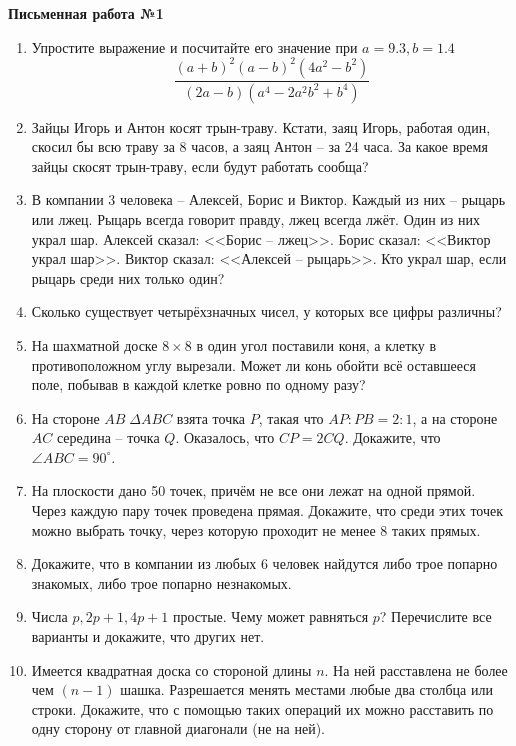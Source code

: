 \documentclass[12pt]{article}
\begin{document}
\centerline{\large \bf Письменная работа №1}
\begin{enumerate}
\item Упростите выражение и посчитайте его значение при $a = 9.3, b = 1.4$
\begin{equation*}
\frac{(a + b)^2(a - b)^2(4a^2 - b^2)}{(2a - b)(a^4 - 2a^2b^2 + b^4)}
\end{equation*}
\item Зайцы Игорь и Антон косят трын-траву. Кстати, заяц Игорь, работая один, скосил бы всю траву за
8 часов, а заяц Антон -- за 24 часа. За какое время зайцы скосят трын-траву, если будут работать
сообща?
\item В компании 3 человека -- Алексей, Борис и Виктор. Каждый из них -- рыцарь или лжец. Рыцарь
всегда говорит правду, лжец всегда лжёт. Один из них украл шар. Алексей сказал: <<Борис -- лжец>>.
Борис сказал: <<Виктор украл шар>>. Виктор сказал: <<Алексей -- рыцарь>>. Кто украл шар, если рыцарь
среди них только один?
\item Сколько существует четырёхзначных чисел, у которых все цифры различны?
\item На шахматной доске $8 \times 8$ в один угол поставили коня, а клетку в противоположном углу вырезали.
Может ли конь обойти всё оставшееся поле, побывав в каждой клетке ровно по одному разу?
\item На стороне $AB \; \Delta ABC$ взята точка $P$, такая что $AP : PB = 2 : 1$, а на стороне $AC$
середина -- точка $Q$. Оказалось, что $CP = 2CQ$. Докажите, что $\angle ABC = 90^{\circ}$.
\item На плоскости дано 50 точек, причём не все они лежат на одной прямой. Через каждую пару точек
проведена прямая. Докажите, что среди этих точек можно выбрать точку, через которую проходит не
менее 8 таких прямых.
\item Докажите, что в компании из  любых 6 человек найдутся либо трое попарно знакомых, либо трое
попарно незнакомых.
\item Числа $p, 2p + 1, 4p + 1$ простые. Чему может равняться $p$? Перечислите все варианты и
докажите, что других нет.
\item Имеется квадратная доска со стороной длины $n$. На ней расставлена не более чем $(n - 1)$
шашка. Разрешается менять местами любые два столбца или строки. Докажите, что с помощью таких
операций их можно расставить по одну сторону от главной диагонали (не на ней).
\end{enumerate}
\end{document}
